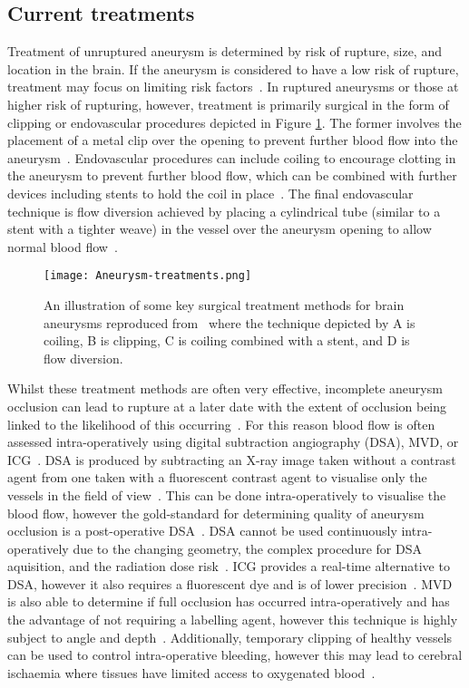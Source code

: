 \subsection{Current treatments}\label{sec:introaneurysmtreatments}
Treatment of unruptured aneurysm is determined by risk of rupture, size, and location in the brain. If the aneurysm is considered to have a low risk of rupture, treatment may focus on limiting risk factors~\cite{NationalHealthService2022}. In ruptured aneurysms or those at higher risk of rupturing, however, treatment is primarily surgical in the form of clipping or endovascular procedures depicted in Figure \ref{fig:aneurysmtreatment}. The former involves the placement of a metal clip over the opening to prevent further blood flow into the aneurysm~\cite{TheBrainFoundation2023}. Endovascular procedures can include coiling to encourage clotting in the aneurysm to prevent further blood flow, which can be combined with further devices including stents to hold the coil in place~\cite{TheBrainFoundation2023}. The final endovascular technique is flow diversion achieved by placing a cylindrical tube (similar to a stent with a tighter weave) in the vessel over the aneurysm opening to allow normal blood flow~\cite{TheBrainFoundation2023}. 
\begin{figure}[h]
    \centering
    \texttt{[image: Aneurysm-treatments.png]}
    \caption{An illustration of some key surgical treatment methods for brain aneurysms reproduced from~ where the technique depicted by A is coiling, B is clipping, C is coiling combined with a stent, and D is flow diversion.}
    \label{fig:aneurysmtreatment}
\end{figure}
Whilst these treatment methods are often very effective, incomplete aneurysm occlusion can lead to rupture at a later date with the extent of occlusion being linked to the likelihood of this occurring~\cite{Toth2018}. For this reason blood flow is often assessed intra-operatively using digital subtraction angiography (DSA), MVD, or ICG~\cite{Norat2019}. DSA is produced by subtracting an X-ray image taken without a contrast agent from one taken with a fluorescent contrast agent to visualise only the vessels in the field of view~\cite{Radiopia2022}. This can be done intra-operatively to visualise the blood flow, however the gold-standard for determining quality of aneurysm occlusion is a post-operative DSA~\cite{Marbacher2020}. DSA cannot be used continuously intra-operatively due to the changing geometry, the complex procedure for DSA aquisition, and the radiation dose risk~\cite{Radiopia2022, Derdeyn1999}. ICG provides a real-time alternative to DSA, however it also requires a fluorescent dye and is of lower precision~\cite{Norat2019, Anania2023}. MVD is also able to determine if full occlusion has occurred intra-operatively and has the advantage of not requiring a labelling agent, however this technique is highly subject to angle and depth~\cite{Anania2023}. Additionally, temporary clipping of healthy vessels can be used to control intra-operative bleeding, however this may lead to cerebral ischaemia where tissues have limited access to oxygenated blood~\cite{Doron2022}. 

